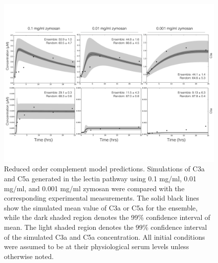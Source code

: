 \documentclass[12pt]{article}
\begin{document}
\begin{figure}[ht]
\centering
\includegraphics[width=1.0\textwidth]{./figs/Figure3_predictions_final_v3.pdf}
\caption{Reduced order complement model predictions.
Simulations of C3a and C5a generated in the lectin pathway using 0.1 mg/ml, 0.01 mg/ml, and 0.001 mg/ml zymosan were compared with the corresponding experimental measurements.
The solid black lines show the simulated mean value of C3a or C5a for the ensemble, while the dark shaded region denotes the 99\% confidence interval of mean.
The light shaded region denotes the 99\% confidence interval of the simulated C3a and C5a concentration.
All initial conditions were assumed to be at their physiological serum levels unless otherwise noted.
}\label{fig-prediction}
\end{figure}

\end{document}
